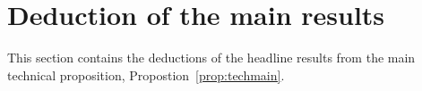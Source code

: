 \makeatletter
  \patchcmd{\arrowfill@}{-7mu}{-14mu}{}{}
  \patchcmd{\arrowfill@}{-7mu}{-14mu}{}{}
  \patchcmd{\arrowfill@}{-2mu}{-4mu}{}{}
  \patchcmd{\arrowfill@}{-2mu}{-4mu}{}{}
\makeatother

\newcommand{\oiint}{\iint}


\newcommand{\N}[1]{\mathcal{N}_{\!\!#1}} %


\newtheorem{theorem}{Theorem}[chapter]
\newtheorem{definition}[theorem]{Definition}
\newtheorem{proposition}[theorem]{Proposition}
\newtheorem{lemma}[theorem]{Lemma}
\newtheorem{sublemma}[theorem]{Sub-lemma}
\newtheorem{corollary}[theorem]{Corollary}
\newtheorem{remark}[theorem]{Remark}
\newtheorem{example}[theorem]{Example}

\newtheorem*{theorem-intro}{Theorem}[chapter]
\newtheorem*{definition-intro}[theorem]{Definition}
\newtheorem*{proposition-intro}[theorem]{Proposition}
\newtheorem*{lemma-intro}[theorem]{Lemma}
\newtheorem*{corollary-intro}[theorem]{Corollary}

\newcommand{\D}[1]{\mathrm{Diff}(#1)}

\newenvironment{diagram}[1][]{\begin{tikzcd}[#1]}{\end{tikzcd}}
\newenvironment{dessin}[1][]{\begin{tikzpicture}[#1]}{\end{tikzpicture}}
\renewcommand\qedhere{}

\newcommand{\intprod}{\,\lrcorner\,}

\newcommand{\N}[1]{\mathcal{N}_{#1}} %


\chapter{Deduction of the main results}
\label{chap:tech}

This section contains the deductions of the headline results from the main technical proposition, Propostion~\ref{prop:techmain}.

